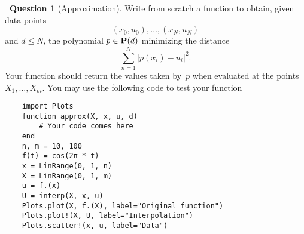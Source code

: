 \documentclass[11pt]{article}
\theoremstyle{definition}
\newtheorem{compexercise}{{\normalfont \faLaptop}~Question}
\begin{document}
\begin{compexercise}
    [Approximation]
    Write from scratch a function to obtain, 
    given data points
    \[
        (x_0, u_0), \dotsc, (x_N, u_N)
    \]
    and $d \leq N$,
    the polynomial $p \in \mathbf P(d)$ minimizing the distance
    \[
        \sum_{n=1}^{N} \bigl\lvert p(x_i) - u_i \bigr\rvert^2.
    \]
    Your function should return the values taken by~$p$
    when evaluated at the points $X_1, \dotsc, X_m$.
    You may use the following code to test your function
    \begin{verbatim}
    import Plots
    function approx(X, x, u, d)
        # Your code comes here
    end
    n, m = 10, 100
    f(t) = cos(2π * t)
    x = LinRange(0, 1, n)
    X = LinRange(0, 1, m)
    u = f.(x)
    U = interp(X, x, u)
    Plots.plot(X, f.(X), label="Original function")
    Plots.plot!(X, U, label="Interpolation")
    Plots.scatter!(x, u, label="Data")
    \end{verbatim}
\end{compexercise}
\end{document}

